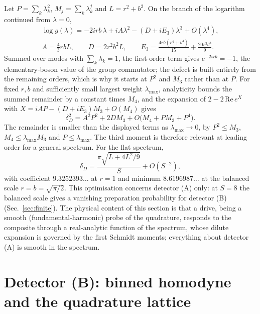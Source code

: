 \documentclass[11pt,a4paper]{article}
\begin{document}
Let $P=\sum_k\lambda_k^2$, $M_j=\sum_k\lambda_k^j$ and $L=r^2+b^2$. On the branch of the logarithm continued from $\lambda=0$,
\begin{equation}
\begin{gathered}
\log g(\lambda)=-2irb\,\lambda+iA\lambda^2-(D+iE_3)\lambda^3+O(\lambda^4),\\
A=\tfrac43 rbL,\qquad D=2r^2b^2L,\qquad E_3=\frac{4rb(r^4+b^4)}{15}+\frac{20r^3b^3}{9}.
\end{gathered}
\label{eq:logg}
\end{equation}
Summed over modes with $\sum_k\lambda_k=1$, the first-order term gives $e^{-2irb}=-1$, the elementary-boson value of the group commutator; the defect is built entirely from the remaining orders, which is why it starts at $P^2$ and $M_3$ rather than at $P$. For fixed $r,b$ and sufficiently small largest weight $\lambda_{\max}$, analyticity bounds the summed remainder by a constant times $M_4$, and the expansion of $2-2\,\mathrm{Re}\,e^{X}$ with $X=iAP-(D+iE_3)M_3+O(M_4)$ gives
\begin{equation}
\delta_D^2=A^2P^2+2DM_3+O\big(M_4+PM_3+P^4\big).
\label{eq:expansion}
\end{equation}
The remainder is smaller than the displayed terms as $\lambda_{\max}\to0$, by $P^2\le M_3$, $M_4\le\lambda_{\max}M_3$ and $P\le\lambda_{\max}$. The third moment is therefore relevant at leading order for a general spectrum. For the flat spectrum,
\begin{equation}
\delta_D=\frac{\pi\sqrt{L+4L^2/9}}{S}+O(S^{-2}),
\label{eq:flatdefect}
\end{equation}
with coefficient $9.3252393\ldots$ at $r=1$ and minimum $8.6196987\ldots$ at the balanced scale $r=b=\sqrt{\pi/2}$. This optimisation concerns detector (A) only: at $S=8$ the balanced scale gives a vanishing preparation probability for detector (B) (Sec.~\ref{sec:finite}). The physical content of this section is that a drive, being a smooth (fundamental-harmonic) probe of the quadrature, responds to the composite through a real-analytic function of the spectrum, whose dilute expansion is governed by the first Schmidt moments; everything about detector (A) is smooth in the spectrum.

\section{Detector (B): binned homodyne and the quadrature lattice}
\label{sec:binned}
\end{document}
